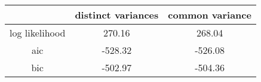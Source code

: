 \begin{tabular}{ccc}
\hline
 & distinct variances & common variance   \\
\hline
log likelihood&  270.16 & 268.04  \\
aic &  -528.32 & -526.08  \\
bic & -502.97& -504.36\\
\hline
\end{tabular}